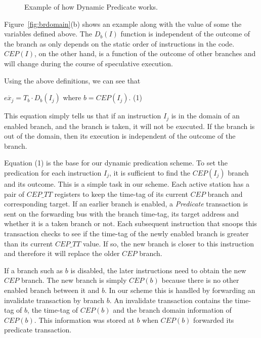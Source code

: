 \documentclass[10pt,twocolumn]{IEEEtran}
\begin{document}
\begin{figure}
{}
\caption{Example of how Dynamic Predicate works.}
\label{fig:dynpred}
\end{figure}  

Figure~\ref{fig:brdomain}(b) shows an example along with the value of
some the variables defined above.  The $D_b(I)$ function is independent
of the outcome of the branch as only depends on the static order of
instructions in the code.  $CEP(I)$, on the other hand, is a function
of the outcome of other branches and will change during the course of
speculative execution.

Using the above definitions, we can see that

$\overline{ex_j} = T_b \cdot D_b(I_j)$  where $b = CEP(I_j)$.   (1)

This equation simply tells us that if an instruction $I_j$ is in the
domain of an enabled branch, and the branch is taken, it will not be
executed.  If the branch is out of the domain, then its execution is
independent of the outcome of the branch.

Equation (1) is the base for our dynamic predication scheme.  To set
the predication for each instruction $I_j$, it is sufficient to find
the $CEP(I_j)$ branch and its outcome.  This is a simple task in our
scheme.  Each active station has a pair of $CEP\_TT$ registers to keep
the time-tag of its current $CEP$ branch and corresponding target.  If
an earlier branch is enabled, a \emph{Predicate} transaction is sent on
the forwarding bus with the branch time-tag, its target address and
whether it is a taken branch or not. Each subsequent instruction that
snoops this transaction checks to see if the time-tag of the newly
enabled branch is greater than its current $CEP\_TT$ value. If so, the
new branch is closer to this instruction and therefore it will replace
the older $CEP$ branch.

If a branch such as $b$ is disabled, the later instructions need to
obtain the new $CEP$ branch.  The new branch is simply $CEP(b)$ because
there is no other enabled branch between it and $b$.  In our scheme
this is handled by forwarding an invalidate transaction by branch $b$.
An invalidate transaction contains the time-tag of $b$, the time-tag of
$CEP(b)$ and the branch domain information of $CEP(b)$.  This
information was stored at $b$ when $CEP(b)$ forwarded its predicate
transaction.
\end{document}
